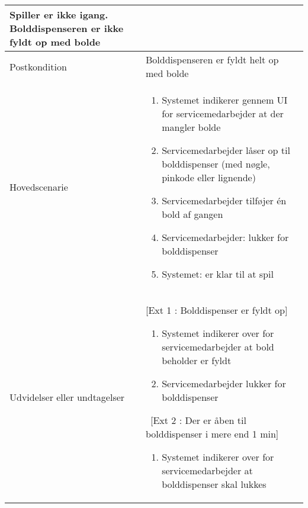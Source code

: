 \documentclass[]{article}
\providecommand{\tightlist}{%
  \setlength{\itemsep}{0pt}\setlength{\parskip}{0pt}}
\begin{document}
\begin{longtable}[]{@{}ll@{}}
\begin{minipage}[t]{0.47\columnwidth}
{Spiller er ikke igang.
Bolddispenseren er ikke fyldt op med bolde}\strut
\end{minipage}\tabularnewline
\toprule
\begin{minipage}[t]{0.47\columnwidth}\raggedright
{Postkondition}\strut
\end{minipage} & \begin{minipage}[t]{0.47\columnwidth}\raggedright
{Bolddispenseren er fyldt helt op med bolde}\strut
\end{minipage}\tabularnewline
\toprule
\begin{minipage}[t]{0.47\columnwidth}\raggedright
{Hovedscenarie}\strut
\end{minipage} & \begin{minipage}[t]{0.47\columnwidth}\raggedright
\begin{enumerate}
\tightlist
\item
  {Systemet indikerer gennem UI for servicemedarbejder at der mangler bolde}
\item
  {Servicemedarbejder låser op til bolddispenser (med nøgle, pinkode eller lignende)}
\item
  {Servicemedarbejder tilføjer én bold af gangen }
\item
  {Servicemedarbejder: lukker for bolddispenser }
\item
  {Systemet: er klar til at spil}
\end{enumerate}\strut
\end{minipage}\tabularnewline
\toprule
\begin{minipage}[t]{0.47\columnwidth}\raggedright
{Udvidelser eller undtagelser}\strut
\end{minipage} & \begin{minipage}[t]{0.47\columnwidth}\raggedright
{[Ext 1 : Bolddispenser er fyldt op]
\begin{enumerate}
\tightlist
\item
  {Systemet indikerer over for servicemedarbejder at bold beholder er fyldt}
\item
  {Servicemedarbejder lukker for bolddispenser}
\end{enumerate}\
[Ext 2 : Der er åben til bolddispenser i mere end 1 min]
\begin{enumerate}
\tightlist
\item
  {Systemet indikerer over for servicemedarbejder at bolddispenser skal lukkes}

\end{enumerate}}
\end{minipage}
\end{longtable}
\end{document}
